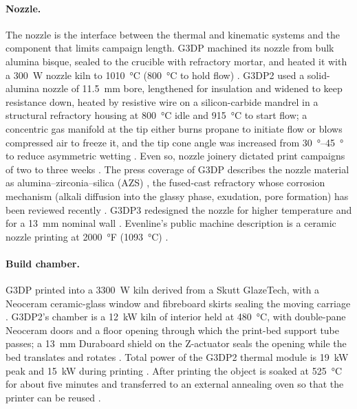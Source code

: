 \paragraph{Nozzle.} The nozzle is the interface between the thermal and kinematic systems and the component that limits campaign length. G3DP machined its nozzle from bulk alumina bisque, sealed to the crucible with refractory mortar, and heated it with a \SI{300}{W} nozzle kiln to \SI{1010}{\celsius} (\SI{800}{\celsius} to hold flow) \citep{klein2015}. G3DP2 used a solid-alumina nozzle of \SI{11.5}{mm} bore, lengthened for insulation and widened to keep resistance down, heated by resistive wire on a silicon-carbide mandrel in a structural refractory housing at \SI{800}{\celsius} idle and \SI{915}{\celsius} to start flow; a concentric gas manifold at the tip either burns propane to initiate flow or blows compressed air to freeze it, and the tip cone angle was increased from \SIrange{30}{45}{\degree} to reduce asymmetric wetting \citep{inamura2018}. Even so, nozzle joinery dictated print campaigns of two to three weeks \citep{inamura2018}. The press coverage of G3DP describes the nozzle material as alumina--zirconia--silica (AZS) \citep{oxman_platform}, the fused-cast refractory whose corrosion mechanism (alkali diffusion into the glassy phase, exudation, pore formation) has been reviewed recently \citep{zircorr2025}. G3DP3 redesigned the nozzle for higher temperature and for a \SI{13}{mm} nominal wall \citep{mit2024masonry,stern2024cgc}. Evenline's public machine description is a ceramic nozzle printing at \SI{2000}{\degree}F (\SI{1093}{\celsius}) \citep{evenline_web}.

\paragraph{Build chamber.} G3DP printed into a \SI{3300}{W} kiln derived from a Skutt GlazeTech, with a Neoceram ceramic-glass window and fibreboard skirts sealing the moving carriage \citep{klein2015}. G3DP2's chamber is a \SI{12}{kW} kiln of  interior held at \SI{480}{\celsius}, with double-pane Neoceram doors and a  floor opening through which the print-bed support tube passes; a \SI{13}{mm} Duraboard shield on the Z-actuator seals the opening while the bed translates and rotates \citep{inamura2018}. Total power of the G3DP2 thermal module is \SI{19}{kW} peak and \SI{15}{kW} during printing \citep{inamura2018}. After printing the object is soaked at \SI{525}{\celsius} for about five minutes and transferred to an external annealing oven so that the printer can be reused \citep{inamura2018}.

